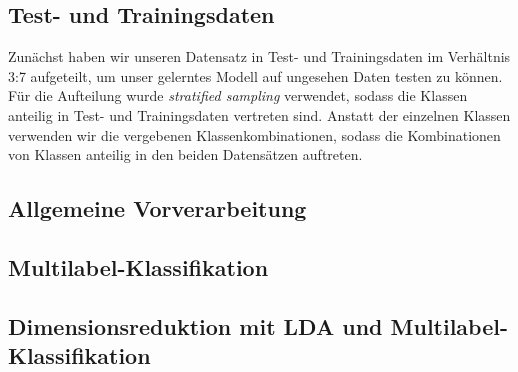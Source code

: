 \subsection{Test- und Trainingsdaten}
\label{sub:test_und_trainingsdaten}
Zunächst haben wir unseren Datensatz in Test- und Trainingsdaten im Verhältnis 3:7 aufgeteilt, um unser gelerntes Modell auf ungesehen Daten testen zu können.
Für die Aufteilung wurde \emph{stratified sampling} verwendet, sodass die Klassen anteilig in Test- und Trainingsdaten vertreten sind.
Anstatt der einzelnen Klassen verwenden wir die vergebenen Klassenkombinationen, sodass die Kombinationen von Klassen anteilig in den beiden Datensätzen auftreten.


\subsection{Allgemeine Vorverarbeitung}

\subsection{Multilabel-Klassifikation}

\subsection{Dimensionsreduktion mit LDA und Multilabel-Klassifikation}

